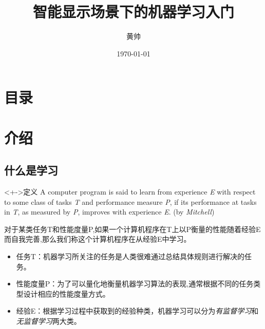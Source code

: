 \documentclass{beamer}
\title{智能显示场景下的机器学习入门}
\author{黄帅}
\date{\today}
\begin{document}
\begin{frame}
\titlepage
\end{frame}

\section*{目录}
    \begin{frame}
        \tableofcontents
    \end{frame}

\section{介绍}
    \subsection{什么是学习}
    \begin{frame}
        \begin{block}<+->{定义}
            A computer program is said to learn from experience \textit E with respect to some class of tasks \textit T and performance measure \textit P, if its performance at tasks in \textit T, as measured by \textit P, improves with experience \textit E. (by \textit{Mitchell})
        \end{block}
        对于某类任务T和性能度量P,如果一个计算机程序在T上以P衡量的性能随着经验E而自我完善,那么我们称这个计算机程序在从经验E中学习。
        \begin{itemize}
            \item 任务T：机器学习所关注的任务是人类很难通过总结具体规则进行解决的任务。
            \item 性能度量P：为了可以量化地衡量机器学习算法的表现,通常根据不同的任务类型设计相应的性能度量方式。
            \item 经验E：根据学习过程中获取到的经验种类，机器学习可以分为\textit{有监督学习}和\textit{无监督学习}两大类。
        \end{itemize}
    \end{frame}
\end{document}
